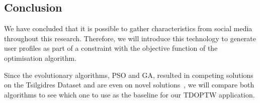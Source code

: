 
\subsection{Conclusion}
We have concluded that it is possible to gather characteristics from social media throughout this
research. Therefore, we will introduce this technology to generate user
profiles as part of a constraint with the objective function of the
optimisation algorithm.

Since the evolutionary algorithms, PSO and GA, resulted in competing solutions
on the Tsilgidres Dataset and are even on novel solutions~\cite{Yu2019, Wisittipanich2020}, we will compare both
algorithms to see which one to use as the baseline for our TDOPTW application.

